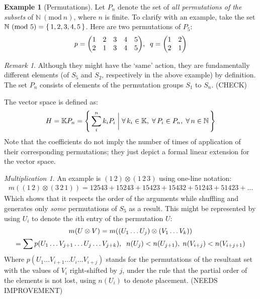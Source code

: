 \documentclass{article}
\theoremstyle{definition}
\newtheorem{Example}{Example}
\theoremstyle{remark}
\newtheorem*{Remark*}{Remark}
\theoremstyle{underline}
\newtheorem*{Multiplication*}{Multiplication}
\theoremstyle{underline}
\newcommand{\Mod}[1]{\ (\mathrm{mod}\ #1)}
\begin{document}
\begin{Example}[Permutations]
Let $P_n$ denote the set of \emph{all permutations of the subsets} of $\mathbb N\Mod n$, where $n$ is finite. To clarify with an example, take the set $\mathbb N\Mod 5 = \qty{\, 1,2,3,4,5 \,}$. Here are two permutations of $P_5$:
\begin{gather}
	p = \mqty(1 & 2 & 3 & 4 & 5 \\ 2 & 1 & 3 & 4 & 5), \;\; q = \mqty(1 & 2 \\ 2 & 1) 
\end{gather}

\begin{Remark*}
Although they might have the `same' action, they are fundamentally different elements (of $S_5$ and $S_2$, respectively in the above example) by definition. The set $P_n$ consists of elements of the permutation groups $S_1$ to $S_n$. (CHECK)
\end{Remark*}

The vector space is defined as:
\begin{gather}
	H = \mathbb KP_n = \qty{\, \sum_{i}^n k_iP_i \;\bigg|\; \forall\, k_i \in \mathbb K,\;\forall\, P_i \in P_n,\;\forall\,n \in \mathbb N\,}
\end{gather}
Note that the coefficients do not imply the number of times of application of their corresponding permutations; they just depict a formal linear extension for the vector space.

\begin{Multiplication*}
An example is $(1 \, 2) \otimes (1 \, 2 \,3)$ using one-line notation:
\begin{gather}
	m((1 \, 2) \otimes (3 \, 2 \, 1)) = 12543 + 15243 + 15423 + 15432 + 51243 + 51423 + \ldots 
\end{gather}
Which shows that it respects the order of the arguments while shuffling and generates only \emph{some} permutations of $S_5$ as a result. This might be represented by using $U_i$ to denote the $i$th entry of the permutation $U$:
\begin{gather}
	m\pqty{U \otimes V} = m\pqty{\pqty{U_1\ldots U_j} \otimes \pqty{V_1\ldots V_k}} \\
	= \sum p(U_1\ldots V_{j + 1} \ldots U_j\ldots V_{j + k}),\;\; n(U_j) < n(U_{j+1}), \; n(V_{i + j}) < n(V_{i + j + 1}) 
\end{gather}
Where $p(U_1\ldots V_{i + 1} \ldots U_i\ldots V_{i + j})$ stands for the permutations of the resultant set with the values of $V_i$ right-shifted by $j$, under the rule that the partial order of the elements is not lost, using $n(U_i)$ to denote placement. (NEEDS IMPROVEMENT)
\end{Multiplication*}


\end{Example}
\end{document}
